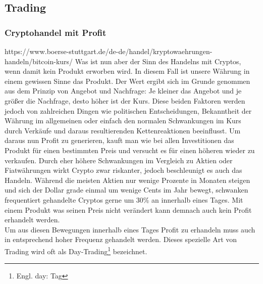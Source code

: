 \documentclass[12pt]{article}
\begin{document}
\subsection{Trading}
	\subsubsection{Cryptohandel mit Profit}
		https://www.boerse-stuttgart.de/de-de/handel/kryptowaehrungen-handeln/bitcoin-kurs/
		Was ist nun aber der Sinn des Handelns mit Cryptos, wenn damit kein Produkt erworben wird. In diesem Fall ist unsere Währung in einem gewissen Sinne das Produkt. Der Wert ergibt sich im Grunde genommen aus dem Prinzip von Angebot und Nachfrage: Je kleiner das Angebot und je größer die Nachfrage, desto höher ist der Kurs. Diese beiden Faktoren werden jedoch von zahlreichen Dingen wie politischen Entscheidungen, Bekanntheit der Währung im allgemeinen oder einfach den normalen Schwankungen im Kurs durch Verkäufe und daraus resultierenden Kettenreaktionen beeinflusst. Um daraus nun Profit zu generieren, kauft man wie bei allen Investitionen das Produkt für einen bestimmten Preis und versucht es für einen höheren wieder zu verkaufen. Durch eher höhere Schwankungen im Vergleich zu Aktien oder Fiatwährungen wirkt Crypto zwar riskanter, jedoch beschleunigt es auch das Handeln. Während die meisten Aktien nur wenige Prozente in Monaten steigen und sich der Dollar grade einmal um wenige Cents im Jahr bewegt, schwanken frequentiert gehandelte Cryptos gerne um 30\% an innerhalb eines Tages. Mit einem Produkt was seinen Preis nicht verändert kann demnach auch kein Profit erhandelt werden.\\
		Um aus diesen Bewegungen innerhalb eines Tages Profit zu erhandeln muss auch in entsprechend hoher Frequenz gehandelt werden. Dieses spezielle Art von Trading wird oft als Day-Trading\footnote{Engl. day: Tag} bezeichnet.
		
\end{document}
